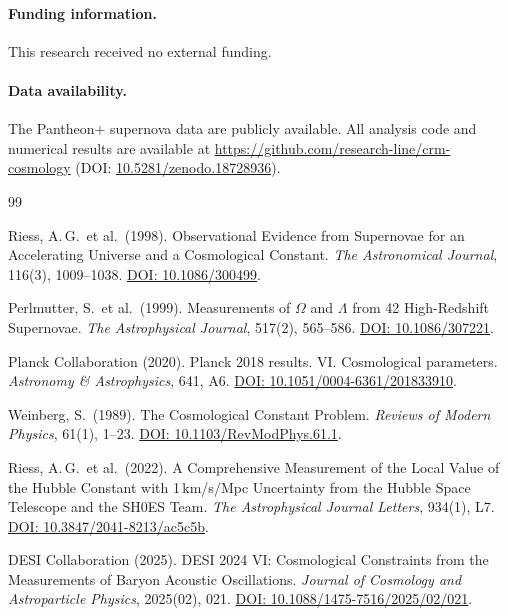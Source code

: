 \documentclass[aps,prd,twocolumn,superscriptaddress,nofootinbib]{revtex4-2}
\begin{document}
\paragraph{Funding information.}
This research received no external funding.

\paragraph{Data availability.}
The Pantheon+ supernova data \cite{Scolnic2022} are publicly available.
All analysis code and numerical results are available at
\url{https://github.com/research-line/crm-cosmology}
(DOI: \href{https://doi.org/10.5281/zenodo.18728936}{10.5281/zenodo.18728936}).

\begin{thebibliography}{99}

Riess, A.\,G.\ et al.\ (1998).
Observational Evidence from Supernovae for an Accelerating Universe and a Cosmological Constant.
\textit{The Astronomical Journal}, 116(3), 1009--1038.
\href{https://doi.org/10.1086/300499}{DOI: 10.1086/300499}.

Perlmutter, S.\ et al.\ (1999).
Measurements of $\Omega$ and $\Lambda$ from 42 High-Redshift Supernovae.
\textit{The Astrophysical Journal}, 517(2), 565--586.
\href{https://doi.org/10.1086/307221}{DOI: 10.1086/307221}.

Planck Collaboration (2020).
Planck 2018 results. VI. Cosmological parameters.
\textit{Astronomy \& Astrophysics}, 641, A6.
\href{https://doi.org/10.1051/0004-6361/201833910}{DOI: 10.1051/0004-6361/201833910}.

Weinberg, S.\ (1989).
The Cosmological Constant Problem.
\textit{Reviews of Modern Physics}, 61(1), 1--23.
\href{https://doi.org/10.1103/RevModPhys.61.1}{DOI: 10.1103/RevModPhys.61.1}.

Riess, A.\,G.\ et al.\ (2022).
A Comprehensive Measurement of the Local Value of the Hubble Constant with 1\,km/s/Mpc Uncertainty from the Hubble Space Telescope and the SH0ES Team.
\textit{The Astrophysical Journal Letters}, 934(1), L7.
\href{https://doi.org/10.3847/2041-8213/ac5c5b}{DOI: 10.3847/2041-8213/ac5c5b}.

DESI Collaboration (2025).
DESI 2024 VI: Cosmological Constraints from the Measurements of Baryon Acoustic Oscillations.
\textit{Journal of Cosmology and Astroparticle Physics}, 2025(02), 021.
\href{https://doi.org/10.1088/1475-7516/2025/02/021}{DOI: 10.1088/1475-7516/2025/02/021}.


\end{thebibliography}
\end{document}
